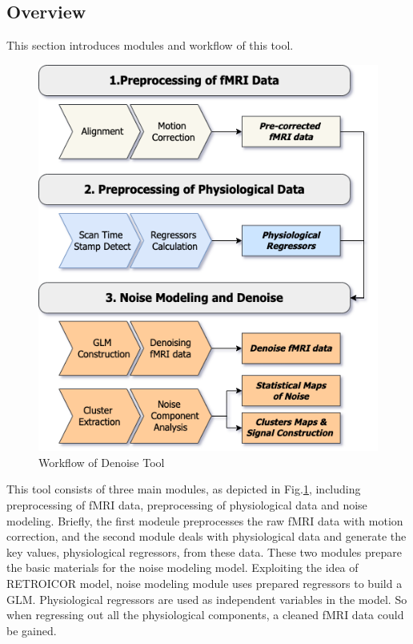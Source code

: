 \subsection{Overview}
This section introduces modules and workflow of this tool.

\begin{figure}[htp]
    \centering
    \includegraphics[width=\columnwidth]{Figures/modules.png}
    \caption{Workflow of Denoise Tool}
    \label{fig:modules}
\end{figure} 

This tool consists of three main modules, as depicted in Fig.\ref{fig:modules}, 
including preprocessing of fMRI data, preprocessing of physiological data  and noise modeling.
Briefly, the first modeule preprocesses the raw fMRI data with motion correction, 
and the second module deals with physiological data and generate the key values,
physiological regressors, from these data. 
These two modules prepare the basic materials for the noise modeling model. 
Exploiting the idea of RETROICOR model, 
noise modeling module uses prepared regressors to build a GLM.
Physiological regressors are used as independent variables in the model. 
So when regressing out all the physiological components, a cleaned fMRI data could be gained. 

